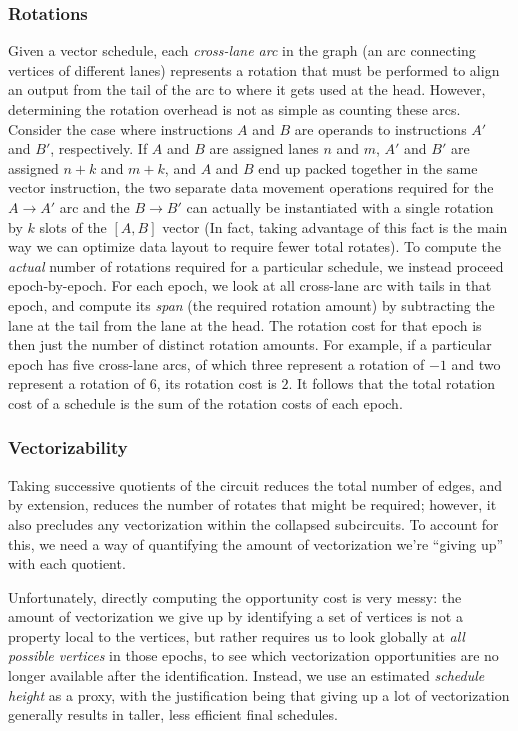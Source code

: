 \subsubsection*{Rotations}
Given a vector schedule, each {\em cross-lane arc} in the graph (an arc connecting vertices of different lanes) represents a rotation that must be performed to align an output from the tail of the arc to where it gets used at the head.
However, determining the rotation overhead is not as simple as counting these arcs.
Consider the case where instructions $A$ and $B$ are operands to instructions $A'$ and $B'$, respectively.
If $A$ and $B$ are assigned lanes $n$ and $m$, $A'$ and $B'$ are assigned $n+k$ and $m+k$, and $A$ and $B$ end up packed together in the same vector instruction, the two separate data movement operations required for the $A\to A'$ arc and the $B\to B'$ can actually be instantiated with a single rotation by $k$ slots of the $[A, B]$ vector (In fact, taking advantage of this fact is the main way we can optimize data layout to require fewer total rotates). 
To compute the {\em actual} number of rotations required for a particular schedule, we instead proceed epoch-by-epoch. 
For each epoch, we look at all cross-lane arc with tails in that epoch, and compute its {\em span} (the required rotation amount) by subtracting the lane at the tail from the lane at the head.
The rotation cost for that epoch is then just the number of distinct rotation amounts.
For example, if a particular epoch has five cross-lane arcs, of which three represent a rotation of $-1$ and two represent a rotation of $6$, its rotation cost is $2$.
It follows that the total rotation cost of a schedule is the sum of the rotation costs of each epoch.

\subsubsection*{Vectorizability}
Taking successive quotients of the circuit reduces the total number of edges, and by extension, reduces the number of rotates that might be required; however, it also precludes any vectorization within the collapsed subcircuits.
To account for this, we need a way of quantifying the amount of vectorization we're ``giving up'' with each quotient.

Unfortunately, directly computing the opportunity cost is very messy: the amount of vectorization we give up by identifying a set of vertices is not a property local to the vertices, but rather requires us to look globally at {\em all possible vertices} in those epochs, to see which vectorization opportunities are no longer available after the identification.
Instead, we use an estimated {\em schedule height} as a proxy, with the justification being that giving up a lot of vectorization generally results in taller, less efficient final schedules. 

